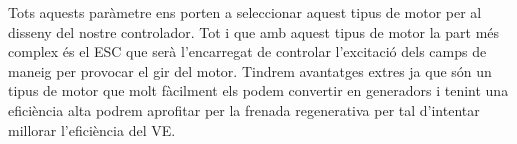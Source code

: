 Tots aquests paràmetre ens porten a seleccionar aquest tipus de motor per al disseny del nostre controlador. Tot i que amb aquest tipus de motor la part més complex és el ESC que serà l'encarregat de controlar l'excitació dels camps de maneig per provocar el gir del motor. Tindrem avantatges extres ja que són un tipus de motor que molt fàcilment els podem convertir en generadors i tenint una eficiència alta podrem aprofitar per la frenada regenerativa per tal d'intentar millorar l'eficiència del VE. 












